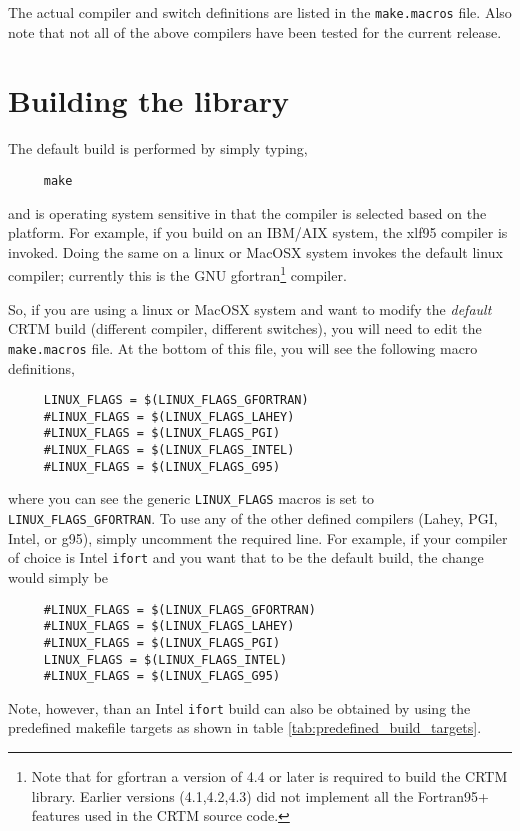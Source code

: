 The actual compiler and switch definitions are listed in the \texttt{make.macros} file. Also note that not all of the above compilers have been tested for the current release.

\section{Building the library}
The default build is performed by simply typing,

\begin{verbatim}     make\end{verbatim}

and is operating system sensitive in that the compiler is selected based on the platform. For example, if you build on an IBM/AIX system, the xlf95 compiler is invoked. Doing the same on a linux or MacOSX system invokes the default linux compiler; currently this is the GNU gfortran\footnote{Note that for gfortran a version of 4.4 or later is required to build the CRTM library. Earlier versions (4.1,4.2,4.3) did not implement all the Fortran95+ features used in the CRTM source code.} compiler.

So, if you are using a linux or MacOSX system and want to modify the \emph{default} CRTM build (different compiler, different switches), you will need to edit the \texttt{make.macros} file. At the bottom of this file, you will see the following macro definitions,
\begin{verbatim}
     LINUX_FLAGS = $(LINUX_FLAGS_GFORTRAN)
     #LINUX_FLAGS = $(LINUX_FLAGS_LAHEY)
     #LINUX_FLAGS = $(LINUX_FLAGS_PGI)
     #LINUX_FLAGS = $(LINUX_FLAGS_INTEL)
     #LINUX_FLAGS = $(LINUX_FLAGS_G95)\end{verbatim}
where you can see the generic \texttt{LINUX\_FLAGS} macros is set to \texttt{LINUX\_FLAGS\_GFORTRAN}. To use any of the other defined compilers (Lahey, PGI, Intel, or g95), simply uncomment the required line. For example, if your compiler of choice is Intel \texttt{ifort} and you want that to be the default build, the change would simply be
\begin{verbatim}
     #LINUX_FLAGS = $(LINUX_FLAGS_GFORTRAN)
     #LINUX_FLAGS = $(LINUX_FLAGS_LAHEY)
     #LINUX_FLAGS = $(LINUX_FLAGS_PGI)
     LINUX_FLAGS = $(LINUX_FLAGS_INTEL)
     #LINUX_FLAGS = $(LINUX_FLAGS_G95)\end{verbatim}
Note, however, than an Intel \texttt{ifort} build can also be obtained by using the predefined makefile targets as shown in table \ref{tab:predefined_build_targets}.
     
